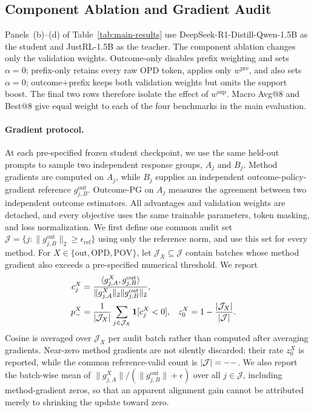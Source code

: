 \subsection{Component Ablation and Gradient Audit}
\label{sec:gradient-audit}

Panels~(b)--(d) of Table~\ref{tab:main-results} use DeepSeek-R1-Distill-Qwen-1.5B as the student and JustRL-1.5B as the teacher.  The component ablation changes only the validation weights.  Outcome-only disables prefix weighting and sets $\alpha=0$; prefix-only retains every raw OPD token, applies only $w^{\mathrm{pre}}$, and also sets $\alpha=0$; outcome+prefix keeps both validation weights but omits the support boost.  The final two rows therefore isolate the effect of $w^{\mathrm{sup}}$.  Macro Avg@8 and Best@8 give equal weight to each of the four benchmarks in the main evaluation.

\paragraph{Gradient protocol.}
At each pre-specified frozen student checkpoint, we use the same held-out prompts to sample two independent response groups, $A_j$ and $B_j$.  Method gradients are computed on $A_j$, while $B_j$ supplies an independent outcome-policy-gradient reference $g^{\mathrm{out}}_{j,B}$.  Outcome-PG on $A_j$ measures the agreement between two independent outcome estimators.  All advantages and validation weights are detached, and every objective uses the same trainable parameters, token masking, and loss normalization.  We first define one common audit set $\mathcal J=\{j:\lVert g^{\mathrm{out}}_{j,B}\rVert_2\geq\epsilon_{\mathrm{ref}}\}$ using only the reference norm, and use this set for every method.  For $X\in\{\mathrm{out},\mathrm{OPD},\mathrm{POV}\}$, let $\mathcal J_X\subseteq\mathcal J$ contain batches whose method gradient also exceeds a pre-specified numerical threshold.  We report
\begin{equation}
\begin{aligned}
c_j^X&=\frac{\langle g^X_{j,A},g^{\mathrm{out}}_{j,B}\rangle}
{\lVert g^X_{j,A}\rVert_2\lVert g^{\mathrm{out}}_{j,B}\rVert_2},\\
p_-^X&=\frac{1}{|\mathcal J_X|}\sum_{j\in\mathcal J_X}{\bf1}[c_j^X<0],
&z_0^X&=1-\frac{|\mathcal J_X|}{|\mathcal J|}.
\end{aligned}
\label{eq:gradient-audit}
\end{equation}
Cosine is averaged over $\mathcal J_X$ per audit batch rather than computed after averaging gradients.  Near-zero method gradients are not silently discarded: their rate $z_0^X$ is reported, while the common reference-valid count is $|\mathcal J|=--$.  We also report the batch-wise mean of $\lVert g^X_{j,A}\rVert/(\lVert g^{\mathrm{out}}_{j,B}\rVert+\epsilon)$ over all $j\in\mathcal J$, including method-gradient zeros, so that an apparent alignment gain cannot be attributed merely to shrinking the update toward zero.

